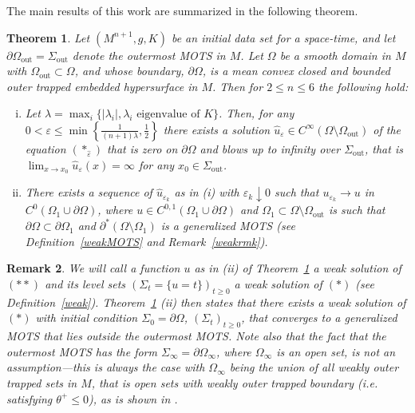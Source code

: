 \documentclass[11pt]{amsart}
\newtheorem{Theorem}{Theorem}
\newtheorem{Remark}[Theorem]{Remark}
\renewcommand{\epsilon}{\varepsilon}
\def\e{\epsilon}
\def\l{\lambda}
\def\out{\text{out}}
\begin{document}
The main results of this work are summarized in the following theorem.
\begin{Theorem}\label{MOTS}
Let $(M^{n+1},g,K)$ be an initial data set for a space-time, and let $\partial\Omega_{\out}=\Sigma_{\out}$ denote the  outermost MOTS in $M$. Let $\Omega$ be a smooth domain in $M$ with $\Omega_\out\subset\Omega$, and whose boundary, $\partial\Omega$, is a mean convex closed and bounded outer trapped embedded hypersurface in $M$. Then for $2\le n\le 6$ the following hold: 
\begin{enumerate}[(i)]
\item Let  $\lambda=\max_i\{|\l_i|, \l_i\text{  eigenvalue of  } K\}$. Then, for any $0<\e\le \min\left\{\frac{1}{(n+1)\lambda}, \frac12\right\}$  there exists a  solution $\hat{u}_{\varepsilon}\in C^\infty(\Omega\setminus\Omega_\out)$ of the equation $(*_{\hat{\varepsilon}})$ that is zero on $\partial\Omega$ and blows up to infinity over $\Sigma_\out$,  that is $\lim_{x\to x_0}\hat u_\e(x)=\infty$ for any $x_0\in \Sigma_\out$.
\item There exists a sequence of $\hat{u}_{\varepsilon_k}$ as in (i) with $\e_k\downarrow 0$ such that $u_{\e_k}\to u$ in $C^0(\Omega_1\cup\partial \Omega)$, where $u\in C^{0,1}(\Omega_1\cup\partial\Omega)$  and $\Omega_1\subset \Omega\setminus \Omega_\out$ is such that $\partial\Omega\subset\partial\Omega_1$ and $\partial^* (\Omega\setminus\Omega_1)$ is a {\it generalized} MOTS (see Definition~\ref{weakMOTS} and Remark~\ref{weakrmk}).
\end{enumerate}
\end{Theorem}\label{main}
\begin{Remark}\label{thmrmk} We will call a function  $u$ as in (ii) of Theorem~\ref{MOTS}  a weak solution of $(**)$ and its level sets  $(\Sigma_t=\{u=t\})_{t\ge 0}$  a weak solution  of $(*)$  (see Definition~\ref{weak}). Theorem~\ref{MOTS} (ii) then states that there exists a weak solution  of $(*)$ with initial condition $\Sigma_0=\partial\Omega$, $(\Sigma_t)_{t\ge 0}$,  that converges to a generalized MOTS that lies outside the outermost MOTS. Note also that the fact that the outermost MOTS has the form $\Sigma_\infty=\partial\Omega_\infty$, where $\Omega_\infty$ is an open set, is not an assumption---this is always the case with $\Omega_\infty$ being the union of all weakly outer trapped sets in $M$, that is open sets with  weakly outer trapped boundary (i.e. satisfying $\theta^+\le 0$), as is shown in \cite{AM09}.
\end{Remark}
\end{document}
